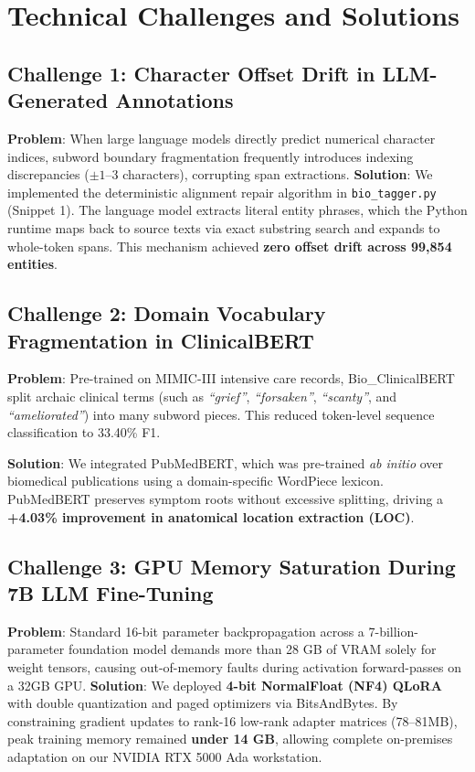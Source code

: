 
\section{Technical Challenges and Solutions}

\subsection{Challenge 1: Character Offset Drift in LLM-Generated Annotations}
\textbf{Problem}: When large language models directly predict numerical character indices, subword boundary fragmentation frequently introduces indexing discrepancies ($\pm 1$--3 characters), corrupting span extractions.  
\textbf{Solution}: We implemented the deterministic alignment repair algorithm in \texttt{bio\_tagger.py} (Snippet 1). The language model extracts literal entity phrases, which the Python runtime maps back to source texts via exact substring search and expands to whole-token spans. This mechanism achieved \textbf{zero offset drift across 99,854 entities}.

\subsection{Challenge 2: Domain Vocabulary Fragmentation in ClinicalBERT}
\textbf{Problem}: Pre-trained on MIMIC-III intensive care records, Bio\_ClinicalBERT split archaic clinical terms (such as \textit{``grief''}, \textit{``forsaken''}, \textit{``scanty''}, and \textit{``ameliorated''}) into many subword pieces. This reduced token-level sequence classification to 33.40\% F1.

\textbf{Solution}: We integrated PubMedBERT, which was pre-trained \textit{ab initio} over biomedical publications using a domain-specific WordPiece lexicon. PubMedBERT preserves symptom roots without excessive splitting, driving a \textbf{+4.03\% improvement in anatomical location extraction (LOC)}.

\subsection{Challenge 3: GPU Memory Saturation During 7B LLM Fine-Tuning}
\textbf{Problem}: Standard 16-bit parameter backpropagation across a 7-billion-parameter foundation model demands more than 28 GB of VRAM solely for weight tensors, causing out-of-memory faults during activation forward-passes on a 32GB GPU.  
\textbf{Solution}: We deployed \textbf{4-bit NormalFloat (NF4) QLoRA} with double quantization and paged optimizers via BitsAndBytes. By constraining gradient updates to rank-16 low-rank adapter matrices (78--81MB), peak training memory remained \textbf{under 14 GB}, allowing complete on-premises adaptation on our NVIDIA RTX 5000 Ada workstation.

